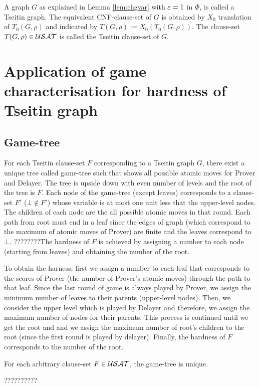 \documentclass{report}
\begin{document}
A graph $G$ as explained in Lemma \ref{lem:chgvar} with $\varepsilon=1$ in $\Phi$, is called a Tseitin graph. The equivalent CNF-clause-set of $G$ is obtained by $X_0$ translation of $T_0(G,\rho)$ and indicated by $T(G,\rho) := X_0(T_0(G,\rho))$. The clause-set $T(G,\rho) \in \mathcal{USAT}$ is called the Tseitin clause-set of $G$.
\section{Application of game characterisation for hardness of Tseitin graph}
\label{sec:appgame}

\subsection{Game-tree}
\label{sec:Game-tree}

For each Tseitin clause-set $F$ corresponding to a Tseitin graph $G$, there exist a unique tree called game-tree such that shows all possible atomic moves for Prover and Delayer. The tree is upside down with even number of levels and the root of the tree is $F$. Each node of the game-tree (except leaves) corresponds to a clause-set $F'$ ($ \bot \not \in F'$) whose variable is at most one unit less that the upper-level nodes. The children of each node are the all possible atomic moves in that round. Each path from root must end in a leaf since the edges of graph (which correspond to the maximum of atomic moves of Prover) are finite and the leaves correspond to $\bot$. ????????The hardness of $F$ is achieved by assigning a number to each node (starting from leaves) and obtaining the number of the root.

To obtain the harness, first we assign a number to each leaf that corresponds to the scores of Prover (the number of Prover's atomic moves) through the path to that leaf. Since the last round of game is always played by Prover, we assign the minimum number of leaves to their parents (upper-level nodes). Then, we consider the upper level which is played by Delayer and therefore, we assign the maximum number of nodes for their parents. This process is continued until we get the root and and we assign the maximum number of root's children to the root (since the first round is played by delayer). Finally, the hardness of $F$ corresponds to the number of the root.

\begin{lem}\label{lem:game2}
For each arbitrary clause-set $F \in \mathcal{USAT}$, the game-tree is unique.
\end{lem}
\begin{prf}
??????????
\end{prf}
\end{document}
